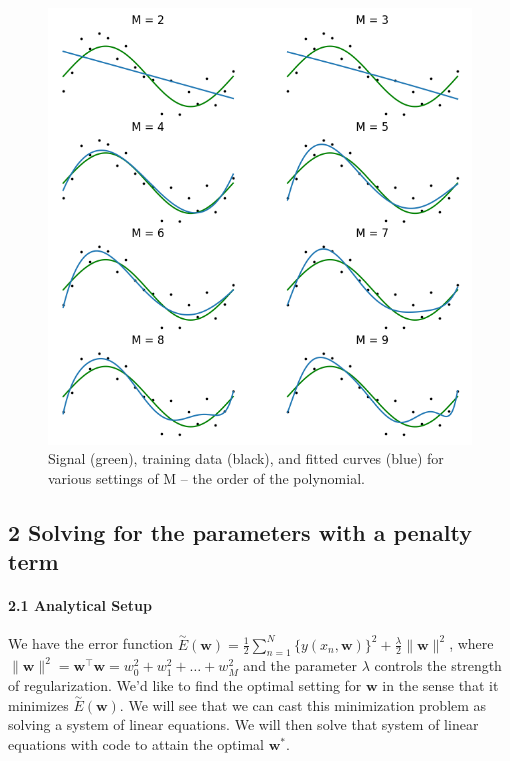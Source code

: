 \documentclass[
  0.875em,
  letterpaper,
  DIV=11,
  numbers=noendperiod]{scrartcl}
\let\oldparagraph\paragraph
\renewcommand{\paragraph}[1]{\oldparagraph{#1}\mbox{}}
\begin{document}
\begin{figure}

{\centering \includegraphics[width=5.20833in,height=\textheight]{./img/mle_w.png}

}

\caption{Signal (green), training data (black), and fitted curves (blue)
for various settings of M -- the order of the polynomial.}

\end{figure}

\hypertarget{solving-for-the-parameters-with-a-penalty-term}{%
\subsection{2 Solving for the parameters with a penalty
term}\label{solving-for-the-parameters-with-a-penalty-term}}

\hypertarget{analytical-setup-1}{%
\paragraph{\texorpdfstring{\textbf{2.1 Analytical
Setup}}{2.1 Analytical Setup}}\label{analytical-setup-1}}

We have the error function
\(\overset{\sim}{E} (\mathbf{w}) = \frac{1}{2} \sum_{n=1}^N \{y(x_n, \mathbf{w}) \}^2 + \frac{\lambda}{2} \lVert \mathbf{w} \rVert^2\),
where
\(\lVert \mathbf{w} \rVert^2 = \mathbf{w}^\intercal \mathbf{w} = w_0^2 + w_1^2 + \dots + w_M^2\)
and the parameter \(\lambda\) controls the strength of regularization.
We'd like to find the optimal setting for \(\mathbf{w}\) in the sense
that it minimizes \(\overset{\sim}{E} (\mathbf{w})\). We will see that
we can cast this minimization problem as solving a system of linear
equations. We will then solve that system of linear equations with code
to attain the optimal \(\mathbf{w}^{*}\).
\end{document}
